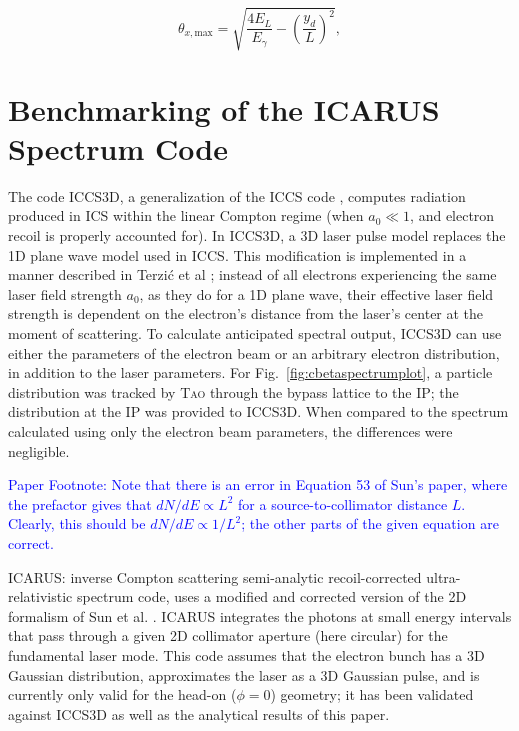 \documentclass[../main.tex]{subfiles}
\begin{document}
\begin{equation}
\theta_{x,\mathrm{max}} = \sqrt{\frac{4E_{L}}{E_{\gamma}}-\left(\frac{y_{d}}{L}\right)^{2}},
\label{eq:theta_max_parameter_1D_sun}
\end{equation}


\section{Benchmarking of the ICARUS Spectrum Code}
\label{sec:benchmarking_of_the_ICARUS_spectrum_code}


The code \textsc{ICCS3D}, a generalization of the \textsc{ICCS} code \cite{krafft2016laser,ranjan2018simulation}, computes radiation produced in ICS within the linear Compton regime (when $a_{0}\ll 1$, and electron recoil is properly accounted for). In \textsc{ICCS3D}, a 3D laser pulse model replaces the 1D plane wave model used in \textsc{ICCS}. This modification is implemented in a manner described in Terzi\'c et al \cite{terzic2019improving}; instead of all electrons experiencing the same laser field strength $a_{0}$, as they do for a 1D plane wave, their effective laser field strength is dependent on the electron's distance from the laser's center at the moment of scattering. To calculate anticipated spectral output, \textsc{ICCS3D} can use either the parameters of the electron beam or an arbitrary electron distribution, in addition to the laser parameters. For Fig.~\ref{fig:cbetaspectrumplot}, a particle distribution was tracked by \textsc{Tao} \cite{TaoManual} through the bypass lattice to the IP; the distribution at the IP was provided to \textsc{ICCS3D}. When compared to the spectrum calculated using only the electron beam parameters, the differences were negligible. 

\textcolor{blue}{Paper Footnote: Note that there is an error in Equation 53 of Sun's paper, where the prefactor gives that $dN/dE\propto L^{2}$ for a source-to-collimator distance $L$. Clearly, this should be $dN/dE\propto 1/L^{2}$; the other parts of the given equation are correct.}

\textsc{ICARUS}: inverse Compton scattering semi-analytic recoil-corrected ultra-relativistic spectrum code, uses a modified and corrected  version of the 2D formalism of Sun et al. \cite{sun2011theoretical}. \textsc{ICARUS} integrates the photons at small energy intervals that pass through a given 2D collimator aperture (here circular) for the fundamental laser mode. This code assumes that the electron bunch has a 3D Gaussian distribution, approximates the laser as a 3D Gaussian pulse, and is currently only valid for the head-on ($\phi = 0$) geometry; it has been validated against \textsc{ICCS3D} as well as the analytical results of this paper. 

 
\end{document}
